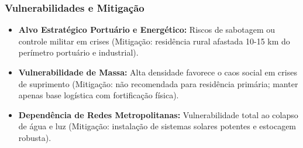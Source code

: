 \subsubsection{Vulnerabilidades e
Mitigação}

\begin{itemize}
\tightlist
\item
  \textbf{Alvo Estratégico Portuário e Energético:} Riscos de sabotagem
  ou controle militar em crises (Mitigação: residência rural afastada
  10-15 km do perímetro portuário e industrial).
\item
  \textbf{Vulnerabilidade de Massa:} Alta densidade favorece o caos
  social em crises de suprimento (Mitigação: não recomendada para
  residência primária; manter apenas base logística com fortificação
  física).
\item
  \textbf{Dependência de Redes Metropolitanas:} Vulnerabilidade total ao
  colapso de água e luz (Mitigação: instalação de sistemas solares
  potentes e estocagem robusta).
\end{itemize}

